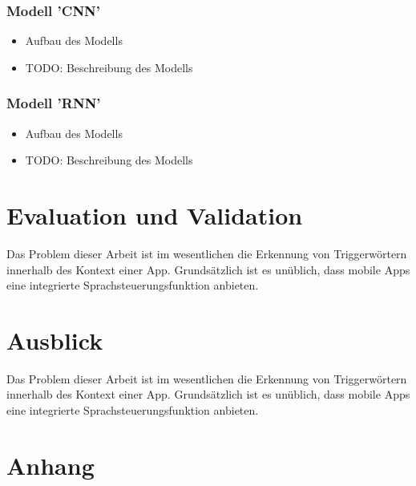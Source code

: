 \documentclass[11pt,a4paper]{article}
\begin{document}
\subsubsection{Modell 'CNN'}
\begin{itemize}
	\item Aufbau des Modells
	\item TODO: Beschreibung des Modells
\end{itemize}

\subsubsection{Modell 'RNN'}
\begin{itemize}
	\item Aufbau des Modells
	\item TODO: Beschreibung des Modells

\end{itemize}



\newpage \section{Evaluation und Validation}
Das Problem dieser Arbeit ist im wesentlichen die Erkennung von Triggerwörtern innerhalb
des Kontext einer App. Grundsätzlich ist es unüblich, dass mobile Apps eine
integrierte Sprachsteuerungsfunktion anbieten.

\newpage \section{Ausblick}
Das Problem dieser Arbeit ist im wesentlichen die Erkennung von Triggerwörtern innerhalb
des Kontext einer App. Grundsätzlich ist es unüblich, dass mobile Apps eine
integrierte Sprachsteuerungsfunktion anbieten.

\newpage \section{Anhang}


\clearpage
\printglossary[type=\acronymtype,title=Akronyme]
\printglossary[title=Glossar]
\listoffigures
{}
\listoftables
\printbibliography[title=Literaturverzeichnis, heading=bibintoc]
\end{document}
